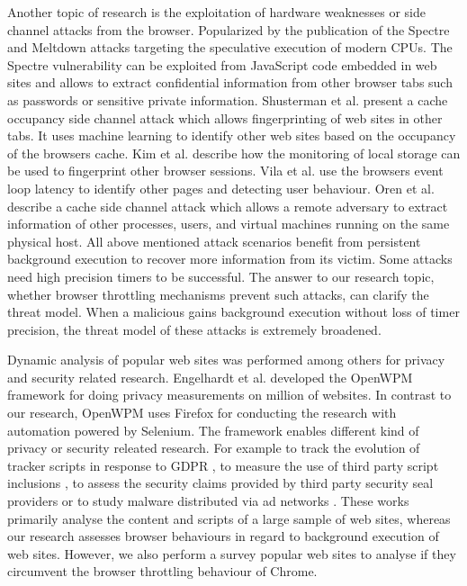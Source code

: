 \documentclass[
	ruledheaders=section,%
	class=report,%
	thesis={type=bachelor},%
	accentcolor=9c,%
	custommargins=true,%
	marginpar=false,%
	parskip=half-,%
	fontsize=11pt,%
]{tudapub}
\begin{document}
  Another topic of research is the exploitation of hardware weaknesses or side channel attacks from the browser. Popularized by the publication of the Spectre \cite{Kocher2018spectre} and Meltdown \cite{Lipp2018meltdown} attacks targeting the speculative execution of modern CPUs. The Spectre vulnerability can be exploited from JavaScript code embedded in web sites and allows to extract confidential information from other browser tabs such as passwords or sensitive private information. Shusterman et al. \cite{shusterman2019robust} present a cache occupancy side channel attack which allows fingerprinting of web sites in other tabs. It uses machine learning to identify other web sites based on the occupancy of the browsers cache. Kim et al. \cite{kim2016inferring} describe how the monitoring of local storage can be used to fingerprint other browser sessions. Vila et al. \cite{vila2017loophole} use the browsers event loop latency to identify other pages and detecting user behaviour. Oren et al. \cite{oren2015spy} describe a cache side channel attack which allows a remote adversary to extract information of other processes, users, and virtual machines running on the same physical host. All above mentioned attack scenarios benefit from persistent background execution to recover more information from its victim. Some attacks need high precision timers to be successful. The answer to our research topic, whether browser throttling mechanisms prevent such attacks, can clarify the threat model. When a malicious gains background execution without loss of timer precision, the threat model of these attacks is extremely broadened.

  Dynamic analysis of popular web sites was performed among others for privacy and security related research. Engelhardt et al. \cite{englehardt2016online} developed the OpenWPM framework for doing privacy measurements on million of websites. In contrast to our research, OpenWPM uses Firefox for conducting the research with automation powered by Selenium. The framework enables different kind of privacy or security releated research. For example to track the evolution of tracker scripts in response to GDPR \cite{solomos2019clash}, to measure the use of third party script inclusions \cite{nikiforakis2012you}, to assess the security claims provided by third party security seal providers \cite{van2014clubbing} or to study malware distributed via ad networks \cite{zarras2014dark}. These works primarily analyse the content and scripts of a large sample of web sites, whereas our research assesses browser behaviours in regard to background execution of web sites. However, we also perform a survey popular web sites to analyse if they circumvent the browser throttling behaviour of Chrome.
  
\end{document}
